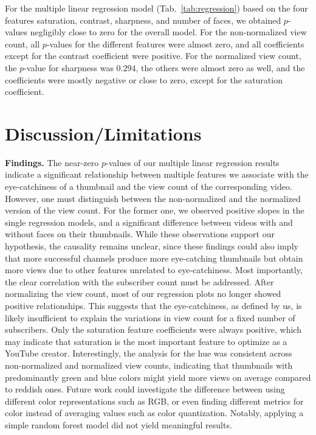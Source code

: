 \documentclass{article}
\begin{document}
For the multiple linear regression model (Tab.~\ref{tab:regression}) based on the four features saturation, contrast, sharpness, and number of faces, we obtained $p$-values negligibly close to zero for the overall model. For the non-normalized view count, all $p$-values for the different features were almost zero, and all coefficients except for the contrast coefficient were positive. For the normalized view count, the $p$-value for sharpness was $0.294$, the others were almost zero as well, and the coefficients were mostly negative or close to zero, except for the saturation coefficient.

\section{Discussion/Limitations}
\textbf{Findings.} The near-zero $p$-values of our multiple linear regression results indicate a significant relationship between multiple features we associate with the eye-catchiness of a thumbnail and the view count of the corresponding video. However, one must distinguish between the non-normalized and the normalized version of the view count. For the former one, we observed positive slopes in the single regression models, and a significant difference between videos with and without faces on their thumbnails. While these observations support our hypothesis, the causality remains unclear, since these findings could also imply that more successful channels produce more eye-catching thumbnails but obtain more views due to other features unrelated to eye-catchiness. Most importantly, the clear correlation with the subscriber count must be addressed. After normalizing the view count, most of our regression plots no longer showed positive relationships. This suggests that the eye-catchiness, as defined by us, is likely insufficient to explain the variations in view count for a fixed number of subscribers. Only the saturation feature coefficients were always positive, which may indicate that saturation is the most important feature to optimize as a YouTube creator. Interestingly, the analysis for the hue was consistent across non-normalized and normalized view counts, indicating that thumbnails with predominantly green and blue colors might yield more views on average compared to reddish ones. Future work could investigate the difference between using different color representations such as RGB, or even finding different metrics for color instead of averaging values such as color quantization. Notably, applying a simple random forest model did not yield meaningful results.
\end{document}

